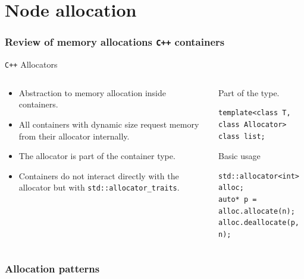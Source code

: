 \documentclass[10pt,aspectratio=169]{beamer}
\begin{document}
\part{Node allocation}

\section{Review of memory allocations \texttt{C++} containers}

\begin{frame}[fragile]{\texttt{C++} Allocators}
\begin{columns}
\begin{column}{0.5\textwidth}
\begin{itemize}
\item Abstraction to memory allocation inside containers.
\item All containers with dynamic size request memory from
their allocator internally.
\item The allocator is part of the container type.
\item Containers do not interact directly with the allocator but with
\texttt{std::allocator\_traits}.
\end{itemize}
\end{column}

\begin{column}{0.5\textwidth}
Part of the type.
\begin{lstlisting}
template<class T, class Allocator>
class list;
\end{lstlisting}

Basic usage
\begin{lstlisting}
std::allocator<int> alloc;
auto* p = alloc.allocate(n);
alloc.deallocate(p, n);
\end{lstlisting}
\end{column}
\end{columns}
\end{frame}

\section{Allocation patterns}
\end{document}
